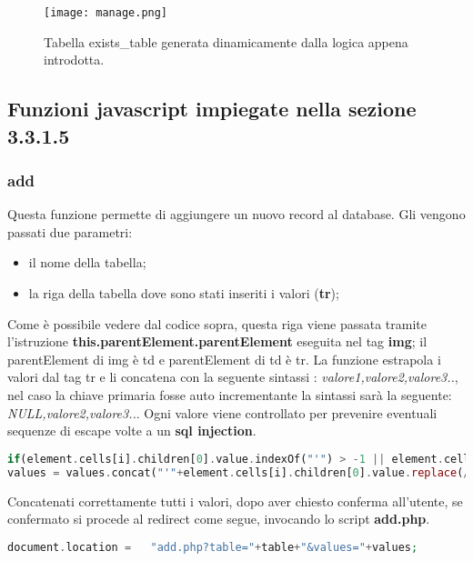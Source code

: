 \begin{figure}[h]
	\centering
	\caption{Tabella exists\_table generata dinamicamente dalla logica appena introdotta.}
	\label{fig:manage}
	\texttt{[image: manage.png]}
\end{figure} 

\newpage

\subsection{Funzioni javascript impiegate nella sezione 3.3.1.5}
\subsubsection{add}
Questa funzione permette di aggiungere un nuovo record al database.
Gli vengono passati due parametri: 
\begin{itemize}
\item il nome della tabella;
\item la riga della tabella dove sono stati inseriti i valori (\textbf{tr});
\end{itemize}
Come è possibile vedere dal codice sopra, questa riga viene passata tramite l'istruzione \textbf{this.parentElement.parentElement} eseguita nel tag \textbf{img}; il parentElement di img è td e parentElement di td è tr. \newline La funzione estrapola i valori dal tag tr e li concatena con la seguente sintassi : \textit{valore1,valore2,valore3..}, nel caso la chiave primaria fosse auto incrementante la sintassi sarà la seguente: \textit{NULL,valore2,valore3..}. Ogni valore viene controllato per prevenire eventuali sequenze di escape volte a un \textbf{sql injection}.
\begin{lstlisting}[language=PHP , caption= Codice di escape]
if(element.cells[i].children[0].value.indexOf("'") > -1 || element.cells[i].children[0].value.indexOf("\"") > -1)
values = values.concat("'"+element.cells[i].children[0].value.replace(/[\\"']/g, '\\$&')+"',");   
\end{lstlisting}
Concatenati correttamente tutti i valori, dopo aver chiesto conferma all'utente, se confermato si procede al redirect come segue, invocando lo script \textbf{add.php}.
\begin{lstlisting}[language=PHP]
document.location =   "add.php?table="+table+"&values="+values;
\end{lstlisting}

